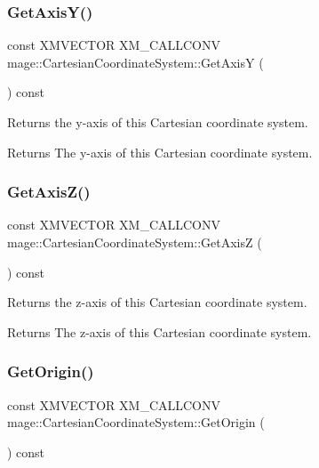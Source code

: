\subsubsection{\texorpdfstring{Get\+Axis\+Y()}{GetAxisY()}}
{\footnotesize\ttfamily const X\+M\+V\+E\+C\+T\+OR X\+M\+\_\+\+C\+A\+L\+L\+C\+O\+NV mage\+::\+Cartesian\+Coordinate\+System\+::\+Get\+AxisY (\begin{DoxyParamCaption}{ }\end{DoxyParamCaption}) const\hspace{0.3cm}{\ttfamily [noexcept]}}

Returns the y-\/axis of this Cartesian coordinate system.

\begin{DoxyReturn}{Returns}
The y-\/axis of this Cartesian coordinate system. 
\end{DoxyReturn}
\hypertarget{structmage_1_1_cartesian_coordinate_system_aa70df85f23edacf47520fb7a67c1d34f}{}\label{structmage_1_1_cartesian_coordinate_system_aa70df85f23edacf47520fb7a67c1d34f} 
\subsubsection{\texorpdfstring{Get\+Axis\+Z()}{GetAxisZ()}}
{\footnotesize\ttfamily const X\+M\+V\+E\+C\+T\+OR X\+M\+\_\+\+C\+A\+L\+L\+C\+O\+NV mage\+::\+Cartesian\+Coordinate\+System\+::\+Get\+AxisZ (\begin{DoxyParamCaption}{ }\end{DoxyParamCaption}) const\hspace{0.3cm}{\ttfamily [noexcept]}}

Returns the z-\/axis of this Cartesian coordinate system.

\begin{DoxyReturn}{Returns}
The z-\/axis of this Cartesian coordinate system. 
\end{DoxyReturn}
\hypertarget{structmage_1_1_cartesian_coordinate_system_a5fa9322a605e7190c491fbf54a07f657}{}\label{structmage_1_1_cartesian_coordinate_system_a5fa9322a605e7190c491fbf54a07f657} 
\subsubsection{\texorpdfstring{Get\+Origin()}{GetOrigin()}}
{\footnotesize\ttfamily const X\+M\+V\+E\+C\+T\+OR X\+M\+\_\+\+C\+A\+L\+L\+C\+O\+NV mage\+::\+Cartesian\+Coordinate\+System\+::\+Get\+Origin (\begin{DoxyParamCaption}{ }\end{DoxyParamCaption}) const\hspace{0.3cm}{\ttfamily [noexcept]}}

